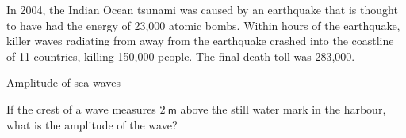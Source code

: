 \begin{definition}
{In 2004, the Indian Ocean tsunami was caused by an earthquake that is thought to have had the energy of 23,000 atomic bombs. Within hours of the earthquake, killer waves radiating from away from the earthquake crashed into the coastline of 11 countries, killing 150,000 people. The final death toll was 283,000.
}

\begin{wex}
{%
Amplitude of sea waves 
}
{%
    \label{m38806*id318469}If the crest of a wave measures $2~\mathsf{m}$ above the still water mark in the harbour, what is the amplitude of the wave? \par 
}
{%
}
\end{wex}
    


\end{definition}
